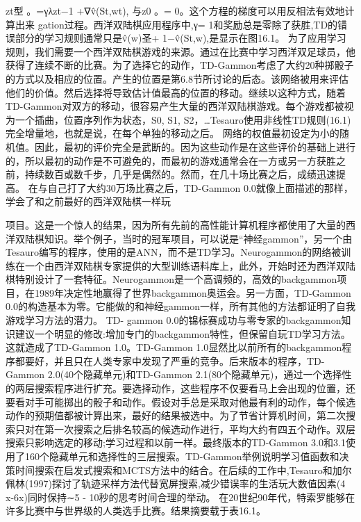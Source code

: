 zt型
。=γλzt−1 +∇v̂(St,wt),
与z0
。= 0。这个方程的梯度可以用反相法有效地计算出来
gation过程。西洋双陆棋应用程序中,γ= 1和奖励总是零除了获胜,TD的错误部分的学习规则通常只是v̂(w)圣+ 1−v̂(St,w),是显示在图16.1。
为了应用学习规则，我们需要一个西洋双陆棋游戏的来源。通过在比赛中学习西洋双足球员，他获得了连续不断的比赛。为了选择它的动作，TD-Gammon考虑了大约20种掷骰子的方式以及相应的位置。产生的位置是第6.8节所讨论的后态。该网络被用来评估他们的价值。然后选择将导致估计值最高的位置的移动。继续以这种方式，随着TD-Gammon对双方的移动，很容易产生大量的西洋双陆棋游戏。每个游戏都被视为一个插曲，位置序列作为状态，S0, S1, S2，…Tesauro使用非线性TD规则(16.1)完全增量地，也就是说，在每个单独的移动之后。
网络的权值最初设定为小的随机值。因此，最初的评价完全是武断的。因为这些动作是在这些评价的基础上进行的，所以最初的动作是不可避免的，而最初的游戏通常会在一方或另一方获胜之前，持续数百或数千步，几乎是偶然的。然而，在几十场比赛之后，成绩迅速提高。
在与自己打了大约30万场比赛之后，TD-Gammon 0.0就像上面描述的那样，学会了和之前最好的西洋双陆棋一样玩

项目。这是一个惊人的结果，因为所有先前的高性能计算机程序都使用了大量的西洋双陆棋知识。举个例子，当时的冠军项目，可以说是“神经gammon”，另一个由Tesauro编写的程序，使用的是ANN，而不是TD学习。Neurogammon的网络被训练在一个由西洋双陆棋专家提供的大型训练语料库上，此外，开始时还为西洋双陆棋特别设计了一套特征。Neurogammon是一个高调频的，高效的backgammon项目，在1989年决定性地赢得了世界backgammon奥运会。另一方面，TD-Gammon 0.0的构造基本为零。它能做的和神经gammon一样，所有其他的方法都证明了自我游戏学习方法的潜力。
TD- gammon 0.0的锦标赛成功与零专家的backgammon知识建议一个明显的修改:增加专门的backgammon特性，但保留自玩TD学习方法。这就造成了TD-Gammon 1.0。TD-Gammon 1.0显然比以前所有的backgammon程序都要好，并且只在人类专家中发现了严重的竞争。后来版本的程序，TD-Gammon 2.0(40个隐藏单元)和TD-Gammon 2.1(80个隐藏单元)，通过一个选择性的两层搜索程序进行扩充。要选择动作，这些程序不仅要看马上会出现的位置，还要看对手可能掷出的骰子和动作。假设对手总是采取对他最有利的动作，每个候选动作的预期值都被计算出来，最好的结果被选中。为了节省计算机时间，第二次搜索只对在第一次搜索之后排名较高的候选动作进行，平均大约有四五个动作。双层搜索只影响选定的移动;学习过程和以前一样。最终版本的TD-Gammon 3.0和3.1使用了160个隐藏单元和选择性的三层搜索。TD-Gammon举例说明学习值函数和决策时间搜索在启发式搜索和MCTS方法中的结合。在后续的工作中,Tesauro和加尔佩林(1997)探讨了轨迹采样方法代替宽屏搜索,减少错误率的生活玩大数值因素(4 x-6x)同时保持∼5 - 10秒的思考时间合理的举动。
在20世纪90年代，特索罗能够在许多比赛中与世界级的人类选手比赛。结果摘要载于表16.1。




